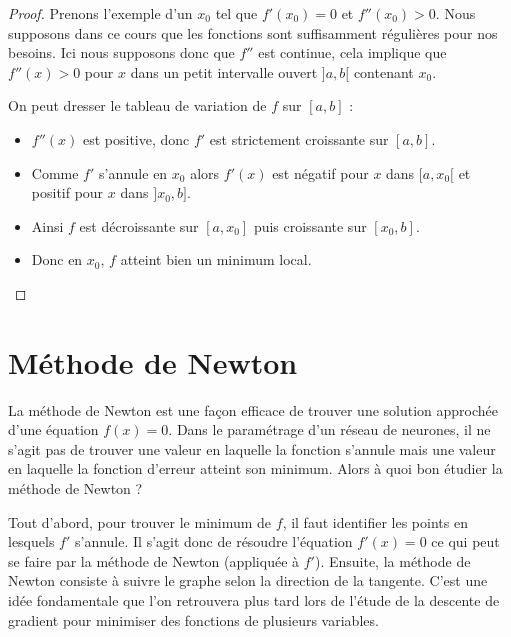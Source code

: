 \documentclass[11pt,class=report,crop=false]{standalone}
\begin{document}
\begin{proof}
Prenons l'exemple d'un $x_0$ tel que $f'(x_0)=0$ et $f''(x_0)>0$.
Nous supposons dans ce cours que les fonctions sont suffisamment régulières pour nos besoins. Ici nous supposons donc que $f''$ est continue, cela implique que $f''(x)>0$ pour $x$ dans un petit intervalle ouvert $]a,b[$ contenant $x_0$.

On peut dresser le tableau de variation de $f$ sur $[a,b]$ :
\begin{itemize}
  \item $f''(x)$ est positive, donc $f'$ est strictement croissante sur $[a,b]$.
  \item Comme $f'$ s'annule en $x_0$ alors $f'(x)$ est négatif pour $x$ dans $[a,x_0[$ et positif pour $x$ dans $]x_0,b]$.
  \item Ainsi $f$ est décroissante sur $[a,x_0]$ puis croissante sur $[x_0,b]$.
  \item Donc en $x_0$, $f$ atteint bien un minimum local.
\end{itemize}
\end{proof}




\section{Méthode de Newton}


La méthode de Newton est une façon efficace de trouver une solution approchée d'une équation $f(x)=0$. Dans le paramétrage d'un réseau de neurones, il ne s'agit pas de trouver une valeur en laquelle la fonction s'annule mais une valeur en laquelle la fonction d'erreur atteint son minimum. Alors à quoi bon étudier la méthode de Newton ?

Tout d'abord, pour trouver le minimum de $f$, il faut identifier les points en lesquels $f'$ s'annule. Il s'agit donc de résoudre l'équation $f'(x)=0$ ce qui peut se faire par la méthode de Newton (appliquée à $f'$). %
Ensuite, la méthode de Newton consiste à suivre le graphe selon la direction de la tangente. C'est une idée fondamentale que l'on retrouvera plus tard lors de l'étude de la \og{}descente de gradient\fg{} pour minimiser des fonctions de plusieurs variables.
\end{document}
